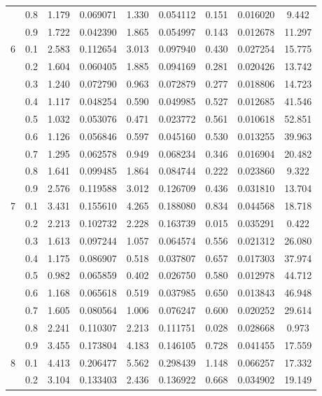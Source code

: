 \begin{longtable}{ | c | c || c | c | c | c | c | c | c | }
 & 0.8 & 1.179 & 0.069071 & 1.330 & 0.054112 & 0.151 & 0.016020 & 9.442 \\
 & 0.9 & 1.722 & 0.042390 & 1.865 & 0.054997 & 0.143 & 0.012678 & 11.297 \\
 \hline
\multirow{9}{*}{6} & 0.1 & 2.583 & 0.112654 & 3.013 & 0.097940 & 0.430 & 0.027254 & 15.775 \\
 & 0.2 & 1.604 & 0.060405 & 1.885 & 0.094169 & 0.281 & 0.020426 & 13.742 \\
 & 0.3 & 1.240 & 0.072790 & 0.963 & 0.072879 & 0.277 & 0.018806 & 14.723 \\
 & 0.4 & 1.117 & 0.048254 & 0.590 & 0.049985 & 0.527 & 0.012685 & 41.546 \\
 & 0.5 & 1.032 & 0.053076 & 0.471 & 0.023772 & 0.561 & 0.010618 & 52.851 \\
 & 0.6 & 1.126 & 0.056846 & 0.597 & 0.045160 & 0.530 & 0.013255 & 39.963 \\
 & 0.7 & 1.295 & 0.062578 & 0.949 & 0.068234 & 0.346 & 0.016904 & 20.482 \\
 & 0.8 & 1.641 & 0.099485 & 1.864 & 0.084744 & 0.222 & 0.023860 & 9.322 \\
 & 0.9 & 2.576 & 0.119588 & 3.012 & 0.126709 & 0.436 & 0.031810 & 13.704 \\
 \hline
\multirow{9}{*}{7} & 0.1 & 3.431 & 0.155610 & 4.265 & 0.188080 & 0.834 & 0.044568 & 18.718 \\
 & 0.2 & 2.213 & 0.102732 & 2.228 & 0.163739 & 0.015 & 0.035291 & 0.422 \\
 & 0.3 & 1.613 & 0.097244 & 1.057 & 0.064574 & 0.556 & 0.021312 & 26.080 \\
 & 0.4 & 1.175 & 0.086907 & 0.518 & 0.037807 & 0.657 & 0.017303 & 37.974 \\
 & 0.5 & 0.982 & 0.065859 & 0.402 & 0.026750 & 0.580 & 0.012978 & 44.712 \\
 & 0.6 & 1.168 & 0.065618 & 0.519 & 0.037985 & 0.650 & 0.013843 & 46.948 \\
 & 0.7 & 1.605 & 0.080564 & 1.006 & 0.076247 & 0.600 & 0.020252 & 29.614 \\
 & 0.8 & 2.241 & 0.110307 & 2.213 & 0.111751 & 0.028 & 0.028668 & 0.973 \\
 & 0.9 & 3.455 & 0.173804 & 4.183 & 0.146105 & 0.728 & 0.041455 & 17.559 \\
 \hline
\multirow{9}{*}{8} & 0.1 & 4.413 & 0.206477 & 5.562 & 0.298439 & 1.148 & 0.066257 & 17.332 \\
 & 0.2 & 3.104 & 0.133403 & 2.436 & 0.136922 & 0.668 & 0.034902 & 19.149 \\

\end{longtable}
